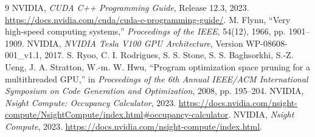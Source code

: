 \begin{chapterbibliography}{9}
  NVIDIA, \emph{CUDA C++ Programming Guide}, Release 12.3, 2023.
  \url{https://docs.nvidia.com/cuda/cuda-c-programming-guide/}.
  M. Flynn, ``Very high-speed computing systems,'' \emph{Proceedings of the IEEE},
  54(12), 1966, pp. 1901--1909.
  NVIDIA, \emph{NVIDIA Tesla V100 GPU Architecture}, Version
  WP-08608-001\_v1.1, 2017.
  S. Ryoo, C. I. Rodrigues, S. S. Stone, S. S. Baghsorkhi, S.-Z. Ueng,
  J. A. Stratton, W.-m. W. Hwu, ``Program optimization space pruning for a
  multithreaded GPU,'' in \emph{Proceedings of the 6th Annual IEEE/ACM
  International Symposium on Code Generation and Optimization}, 2008,
  pp. 195--204.
  NVIDIA, \emph{Nsight Compute: Occupancy Calculator}, 2023.
  \url{https://docs.nvidia.com/nsight-compute/NsightCompute/index.html#occupancy-calculator}.
  NVIDIA, \emph{Nsight Compute}, 2023.
  \url{https://docs.nvidia.com/nsight-compute/index.html}.
\end{chapterbibliography}
